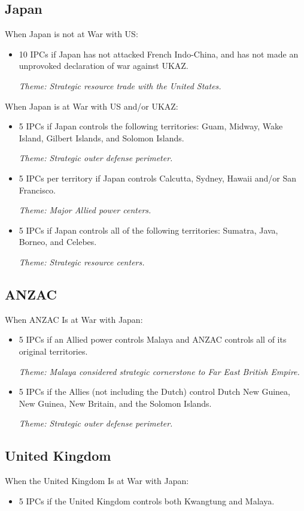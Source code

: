 \documentclass[10pt,twoside]{article}
\begin{document}
\begin{multicols*}{3}
\begin{minipage}{\linewidth}
\subsection*{Japan}
When Japan is not at War with US:
\begin{itemize}
\item 10 IPCs if Japan has not attacked French Indo-China, and has not made an unprovoked declaration of war against UKAZ. 

\textsl{Theme: Strategic resource trade with the United States.}
\end{itemize}
When Japan is at War with US and/or UKAZ:
\begin{itemize}
\item 5 IPCs if Japan controls the following territories: Guam, Midway, Wake Island, Gilbert Islands, and Solomon Islands.

\textsl{Theme: Strategic outer defense perimeter.}
\item 5 IPCs per territory if Japan controls Calcutta, Sydney, Hawaii and/or San Francisco.

\textsl{Theme: Major Allied power centers.}
\item 5 IPCs if Japan controls all of the following territories: Sumatra, Java, Borneo, and Celebes.

\textsl{Theme: Strategic resource centers.}
\end{itemize}

\subsection*{ANZAC}
When ANZAC Is at War with Japan:
\begin{itemize}
\item 5 IPCs if an Allied power controls Malaya and ANZAC controls all of its original territories.

\textsl{Theme: Malaya considered strategic cornerstone to Far East British Empire.}
\item 5 IPCs if the Allies (not including the Dutch) control Dutch New Guinea, New Guinea, New Britain, and the Solomon Islands.

\textsl{Theme: Strategic outer defense perimeter.}
\end{itemize}
\end{minipage}
\columnbreak

\subsection*{United Kingdom}
When the United Kingdom Is at War with Japan:
\begin{itemize}
\item 5 IPCs if the United Kingdom controls both Kwangtung
and Malaya.


\end{itemize}
\end{multicols*}
\end{document}
